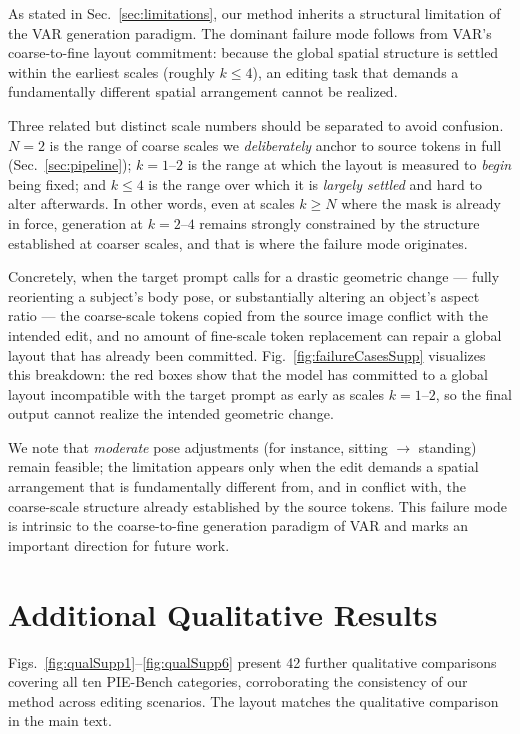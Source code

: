 As stated in Sec.~\ref{sec:limitations}, our method inherits a structural
limitation of the VAR generation paradigm. The dominant failure mode follows from
VAR's coarse-to-fine layout commitment: because the global spatial structure is
settled within the earliest scales (roughly $k \leq 4$), an editing task that
demands a fundamentally different spatial arrangement cannot be realized.

Three related but distinct scale numbers should be separated to avoid confusion.
$N{=}2$ is the range of coarse scales we \textit{deliberately} anchor to source
tokens in full (Sec.~\ref{sec:pipeline}); $k{=}1$--$2$ is the range at which the
layout is measured to \textit{begin} being fixed; and $k \leq 4$ is the range
over which it is \textit{largely settled} and hard to alter afterwards. In other
words, even at scales $k \geq N$ where the mask is already in force, generation at
$k{=}2$--$4$ remains strongly constrained by the structure established at coarser
scales, and that is where the failure mode originates.

Concretely, when the target prompt calls for a drastic geometric change --- fully
reorienting a subject's body pose, or substantially altering an object's aspect
ratio --- the coarse-scale tokens copied from the source image conflict with the
intended edit, and no amount of fine-scale token replacement can repair a global
layout that has already been committed. Fig.~\ref{fig:failureCasesSupp}
visualizes this breakdown: the red boxes show that the model has committed to a
global layout incompatible with the target prompt as early as scales
$k{=}1$--$2$, so the final output cannot realize the intended geometric change.

We note that \textit{moderate} pose adjustments (for instance, sitting $\to$
standing) remain feasible; the limitation appears only when the edit demands a
spatial arrangement that is fundamentally different from, and in conflict with,
the coarse-scale structure already established by the source tokens. This failure
mode is intrinsic to the coarse-to-fine generation paradigm of VAR and marks an
important direction for future work.

\section{Additional Qualitative Results}
\label{app:qualitative}

Figs.~\ref{fig:qualSupp1}--\ref{fig:qualSupp6} present 42 further qualitative
comparisons covering all ten PIE-Bench categories, corroborating the consistency
of our method across editing scenarios. The layout matches the qualitative
comparison in the main text.

